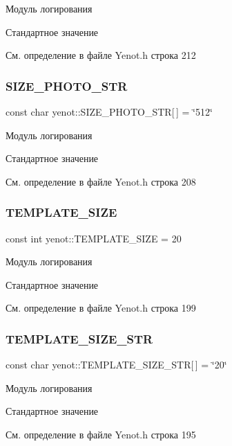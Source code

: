 Модуль логирования

Стандартное значение 

См. определение в файле Yenot.\+h строка 212

\mbox{\label{namespaceyenot_a172f1253ba2c664d26caffab97a6253d}} 
\subsubsection{\texorpdfstring{S\+I\+Z\+E\+\_\+\+P\+H\+O\+T\+O\+\_\+\+S\+TR}{SIZE\_PHOTO\_STR}}
{\footnotesize\ttfamily const char yenot\+::\+S\+I\+Z\+E\+\_\+\+P\+H\+O\+T\+O\+\_\+\+S\+TR\mbox{[}$\,$\mbox{]} = \char`\"{}512\char`\"{}}

Модуль логирования

Стандартное значение 

См. определение в файле Yenot.\+h строка 208

\mbox{\label{namespaceyenot_a6c04317b4747d569efcf92266bb1051b}} 
\subsubsection{\texorpdfstring{T\+E\+M\+P\+L\+A\+T\+E\+\_\+\+S\+I\+ZE}{TEMPLATE\_SIZE}}
{\footnotesize\ttfamily const int yenot\+::\+T\+E\+M\+P\+L\+A\+T\+E\+\_\+\+S\+I\+ZE = 20}

Модуль логирования

Стандартное значение 

См. определение в файле Yenot.\+h строка 199

\mbox{\label{namespaceyenot_acfc97705229a010013bb0433327bf707}} 
\subsubsection{\texorpdfstring{T\+E\+M\+P\+L\+A\+T\+E\+\_\+\+S\+I\+Z\+E\+\_\+\+S\+TR}{TEMPLATE\_SIZE\_STR}}
{\footnotesize\ttfamily const char yenot\+::\+T\+E\+M\+P\+L\+A\+T\+E\+\_\+\+S\+I\+Z\+E\+\_\+\+S\+TR\mbox{[}$\,$\mbox{]} = \char`\"{}20\char`\"{}}

Модуль логирования

Стандартное значение 

См. определение в файле Yenot.\+h строка 195

